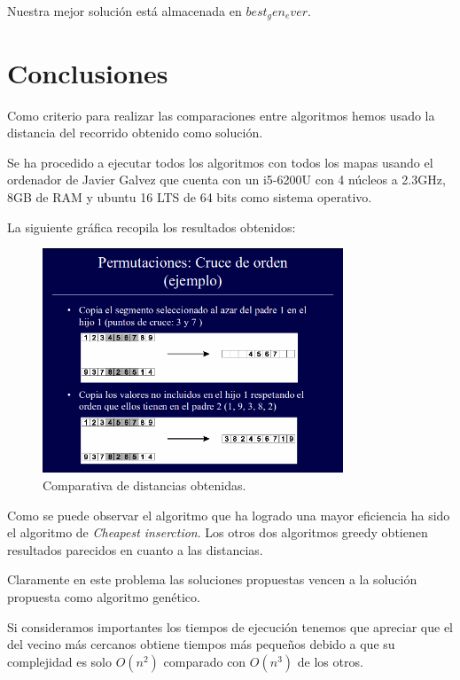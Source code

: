 \documentclass{article}
\begin{document}
Nuestra mejor solución está almacenada en $best_gen_ever$.
\section{Conclusiones}

Como criterio para realizar las comparaciones entre algoritmos hemos usado la
distancia del recorrido obtenido como solución.

Se ha procedido a ejecutar todos los algoritmos con todos los mapas
usando el ordenador de Javier Galvez que cuenta con un i5-6200U con 4
núcleos a 2.3GHz, 8GB de RAM y ubuntu 16 LTS de 64 bits como sistema
operativo.

La siguiente gráfica recopila los resultados obtenidos:

\begin{figure}[H]
  \centering
  \includegraphics[width=0.8\textwidth]{imag1.png}
  \caption{Comparativa de distancias obtenidas.}
\end{figure}

Como se puede observar el algoritmo que ha logrado una mayor
eficiencia ha sido el algoritmo de \textit{Cheapest inserction}. Los
otros dos algoritmos greedy obtienen resultados parecidos en cuanto a
las distancias.

Claramente en este problema las soluciones propuestas vencen a la
solución propuesta como algoritmo genético.

Si consideramos importantes los tiempos de ejecución tenemos que
apreciar que el del vecino más cercanos obtiene tiempos más pequeños
debido a que su complejidad es solo $O(n^2)$ comparado con $O(n^3)$ de
los otros.
\end{document}
